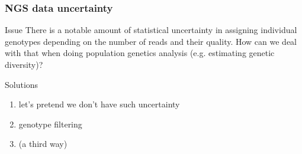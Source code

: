 


\begin{frame}
\frametitle{NGS data uncertainty}

	\begin{block}{Issue}
		There is a notable amount of statistical uncertainty in assigning individual genotypes depending on the number of reads and their quality.
		How can we deal with that when doing population genetics analysis (e.g. estimating genetic diversity)?
	\end{block}

	\begin{block}{Solutions}
		\begin{enumerate}
			\item let's pretend we don't have such uncertainty
			\pause
			\item genotype filtering
			\item (a third way)
		\end{enumerate}
	\end{block}

\end{frame}



